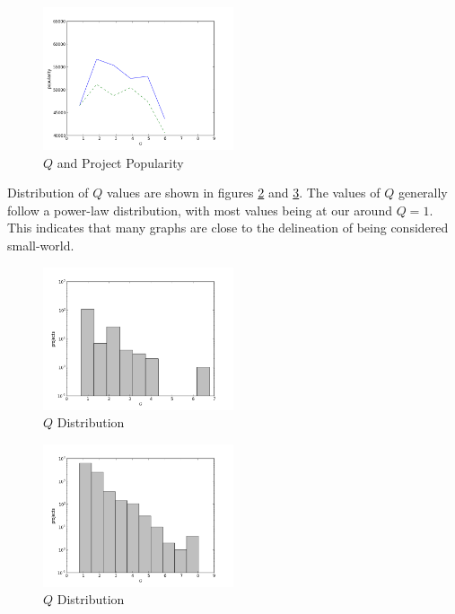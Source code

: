 \documentclass{proc}
\begin{document}
\begin{figure}
\begin{center}
\includegraphics[width=0.5\textwidth]{images/sf-graph.png}
\end{center}
\caption{$Q$ and Project Popularity}
\label{fig:q_sf_graph}
\end{figure}

Distribution of $Q$ values are shown in figures \ref{fig:q_fc_distribution} and \ref{fig:q_sf_distribution}. The values of $Q$ generally follow a power-law distribution, with most values being at our around {$Q = 1$}. This indicates that many graphs are close to the delineation of being considered small-world\cite{humphries2008network}.


\begin{figure}
\begin{center}
\includegraphics[width=0.5\textwidth]{images/freecode-q-histo.png}
\end{center}
\caption{$Q$ Distribution}
\label{fig:q_fc_distribution}
\end{figure}

\begin{figure}
\begin{center}
\includegraphics[width=0.5\textwidth]{images/sf-q-histo.png}
\end{center}
\caption{$Q$ Distribution}
\label{fig:q_sf_distribution}
\end{figure}
\end{document}
